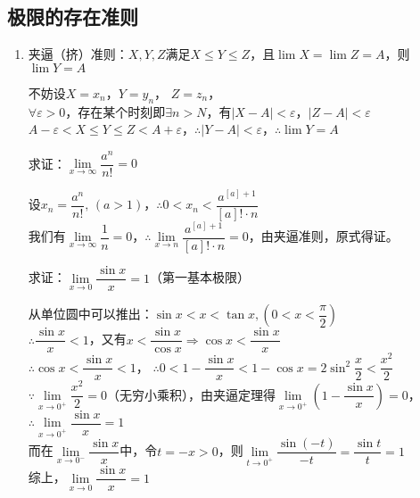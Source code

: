 \documentclass[11pt,fleqn]{book} %
\begin{document}
\subsection{极限的存在准则}
\begin{enumerate}
\item 夹逼（挤）准则：$X,Y,Z$满足$X \leqslant Y \leqslant Z$，且$\lim X = \lim Z = A$，则$\lim Y = A$
\begin{prove}
不妨设$X=x_n$，$Y = y_n$， $Z = z_n$，\\
$\forall \varepsilon>0$，存在某个时刻即$\exists n > N$，有$|X-A|<\varepsilon$，$|Z-A|<\varepsilon$\\
$A-\varepsilon<X\leqslant Y\leqslant Z<A+\varepsilon$，$\therefore |Y-A|<\varepsilon$，$\therefore \lim Y = A$
\end{prove}
\begin{example}
求证：$\lim\limits_{x \rightarrow \infty} \dfrac{a^n}{n!}=0$
\end{example}
\begin{prove}
设$x_n = \dfrac{a^n}{n!},\,(a>1)$，$\therefore 0<x_n<\dfrac{a^{[a]+1}}{[a]!\cdot n}$\\
我们有$\lim\limits_{x \rightarrow \infty} \dfrac{1}{n}=0$，$\therefore \lim\limits_{x\rightarrow n}\dfrac{a^{[a]+1}}{[a]!\cdot n}=0$，由夹逼准则，原式得证。
\end{prove}
\begin{example}
求证：$\lim\limits_{x \rightarrow 0}\dfrac{\sin x}{x}=1$（第一基本极限）
\end{example}
\begin{prove}
从单位圆中可以推出：$\sin x < x < \tan x, (0<x<\dfrac{\pi}{2})$\\
$\therefore \dfrac{\sin x}{x}<1$，又有$x<\dfrac{\sin x}{\cos x} \Rightarrow \cos x <\dfrac{\sin x}{x}$\\
$\therefore \cos x < \dfrac{\sin x}{x} < 1$，
$\therefore 0 < 1-\dfrac{\sin x}{x} < 1- \cos x=2\sin^2\dfrac{x}{2}<\dfrac{x^2}{2}$\\
$\because \lim\limits_{x\rightarrow 0^+} \dfrac{x^2}{2}=0$（无穷小乘积），由夹逼定理得$\lim\limits_{x\rightarrow 0^+}\left(1- \dfrac{\sin x}{x}\right) = 0$，$\therefore \lim\limits_{x\rightarrow 0^+} \dfrac{\sin x}{x} = 1$\\
而在$\lim\limits_{x\rightarrow 0^-}\dfrac{\sin x}{x}$中，令$t = -x >0$，则$\lim\limits_{t\rightarrow 0^+}\dfrac{\sin (-t)}{-t}=\dfrac{\sin t}{t}=1$\\
综上，$\lim\limits_{x \rightarrow 0}\dfrac{\sin x}{x}=1$
\end{prove}

\end{enumerate}
\end{document}
